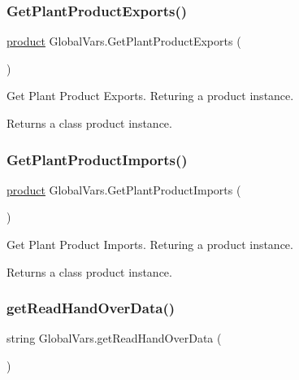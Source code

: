 \subsubsection{\texorpdfstring{GetPlantProductExports()}{GetPlantProductExports()}}
{\footnotesize\ttfamily \mbox{\hyperlink{class_global_vars_1_1product}{product}} Global\+Vars.\+Get\+Plant\+Product\+Exports (\begin{DoxyParamCaption}{ }\end{DoxyParamCaption})\hspace{0.3cm}{\ttfamily [inline]}}



Get Plant Product Exports. Returing a product instance. 

\begin{DoxyReturn}{Returns}
a class product instance. 
\end{DoxyReturn}
\mbox{\label{class_global_vars_a460ab7fc30f0bfd0ac2f70da9773c661}} 
\subsubsection{\texorpdfstring{GetPlantProductImports()}{GetPlantProductImports()}}
{\footnotesize\ttfamily \mbox{\hyperlink{class_global_vars_1_1product}{product}} Global\+Vars.\+Get\+Plant\+Product\+Imports (\begin{DoxyParamCaption}{ }\end{DoxyParamCaption})\hspace{0.3cm}{\ttfamily [inline]}}



Get Plant Product Imports. Returing a product instance. 

\begin{DoxyReturn}{Returns}
a class product instance. 
\end{DoxyReturn}
\mbox{\label{class_global_vars_a0989d5988f75ed2be0993c16cb3397be}} 
\subsubsection{\texorpdfstring{getReadHandOverData()}{getReadHandOverData()}}
{\footnotesize\ttfamily string Global\+Vars.\+get\+Read\+Hand\+Over\+Data (\begin{DoxyParamCaption}{ }\end{DoxyParamCaption})\hspace{0.3cm}{\ttfamily [inline]}}



